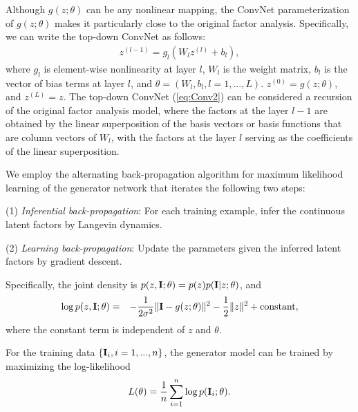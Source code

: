 \documentclass[11pt]{article}
\def\I{{\bf I}}
\begin{document}
Although $g(z; \theta)$ can be any nonlinear mapping, the ConvNet parameterization of $g(z; \theta)$ makes it particularly close to the original factor analysis. Specifically, we can write the top-down ConvNet as follows:
\begin{eqnarray}
z^{(l-1)} = g_l(W_l z^{(l)} + b_l), \label{eq:Conv2}
\end{eqnarray}
where $g_l$ is element-wise nonlinearity at layer $l$, $W_l$ is the weight matrix, $b_l$ is the vector of bias terms at layer $l $, and $\theta = (W_l, b_l, l = 1, ..., L)$.  $z^{(0)} = g(z; \theta)$, and $z^{(L)} = z$. The top-down ConvNet (\ref{eq:Conv2}) can be considered a recursion of the original factor analysis model, where the factors at the layer $l-1$ are obtained by the linear superposition of the basis vectors or basis functions that are column vectors of $W_l$, with the factors at the layer $l$ serving as the coefficients of the linear superposition. 

We employ the alternating back-propagation algorithm for maximum likelihood learning of the generator network that iterates the following two steps:

(1) {\em  Inferential back-propagation}: For each training example,  infer the continuous latent factors by Langevin dynamics.

(2) {\em Learning back-propagation}: Update the parameters given the inferred latent factors by gradient descent.  

Specifically, the joint density is $p(z, \I; \theta) = p(z) p(\I|z; \theta)$, and
\begin{eqnarray}
\log p(z, \I; \theta) &=& - \frac{1}{2\sigma^2} \|\I - g(z; \theta)\|^2 - \frac{1}{2} \|z\|^2 + {\rm constant}, \label{eq:complete}
\end{eqnarray}
where the constant term is independent of $z$ and $\theta$.

For the training data $\{\I_i, i = 1, ..., n\}$, the generator model can be trained by maximizing the log-likelihood
\begin{eqnarray}
L(\theta) = \frac{1}{n}  \sum_{i=1}^{n} \log p(\I_i; \theta).
\end{eqnarray}
\end{document}
